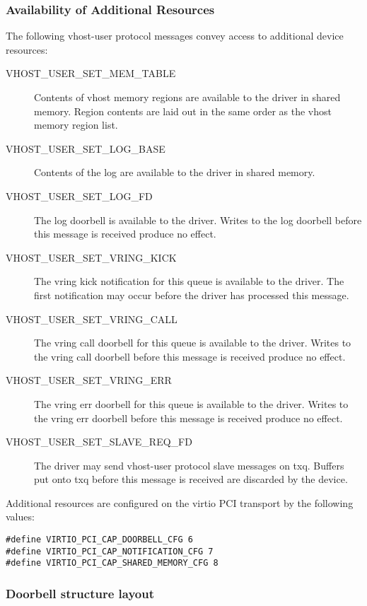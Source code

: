 \subsubsection{Availability of Additional Resources}\label{sec:Device Types / Vhost-user Device Backend / Additional Device Resources over PCI / Availability of Additional Resources}

The following vhost-user protocol messages convey access to additional device
resources:

\begin{description}
\item[VHOST_USER_SET_MEM_TABLE] Contents of vhost memory regions are available to the driver in shared memory.  Region contents are laid out in the same order as the vhost memory region list.
\item[VHOST_USER_SET_LOG_BASE] Contents of the log are available to the driver in shared memory.
\item[VHOST_USER_SET_LOG_FD] The log doorbell is available to the driver.  Writes to the log doorbell before this message is received produce no effect.
\item[VHOST_USER_SET_VRING_KICK] The vring kick notification for this queue is available to the driver.  The first notification may occur before the driver has processed this message.
\item[VHOST_USER_SET_VRING_CALL] The vring call doorbell for this queue is available to the driver.  Writes to the vring call doorbell before this message is received produce no effect.
\item[VHOST_USER_SET_VRING_ERR] The vring err doorbell for this queue is available to the driver.  Writes to the vring err doorbell before this message is received produce no effect.
\item[VHOST_USER_SET_SLAVE_REQ_FD] The driver may send vhost-user protocol slave messages on txq.  Buffers put onto txq before this message is received are discarded by the device.
\end{description}

Additional resources are configured on the virtio PCI transport by the following  values:

\begin{lstlisting}
#define VIRTIO_PCI_CAP_DOORBELL_CFG 6
#define VIRTIO_PCI_CAP_NOTIFICATION_CFG 7
#define VIRTIO_PCI_CAP_SHARED_MEMORY_CFG 8
\end{lstlisting}

\subsubsection{Doorbell structure layout}\label{sec:Device Types / Vhost-user Device Backend / Additional Device Resources over PCI / Doorbell capability}

